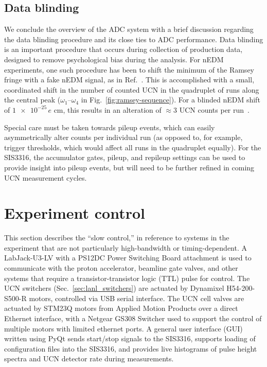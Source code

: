 
\subsection{Data blinding}\label{sec:sis3316_data_blinding}


We conclude the overview of the ADC system with a brief discussion regarding the data blinding procedure and its close ties to ADC performance. Data blinding is an important procedure that occurs during collection of production data, designed to remove psychological bias during the analysis. For nEDM experiments, one such procedure has been to shift the minimum of the Ramsey fringe with a fake nEDM signal, as in Ref.~\cite{Ayres_psi_data_blinding_2021}. This is accomplished with a small, coordinated shift in the number of counted UCN in the quadruplet of runs along the central peak ($\omega_1$--$\omega_4$ in Fig.~\ref{fig:ramsey-sequence}). For a blinded nEDM shift of $\num{1e-25}\,e\text{ cm}$, this results in an alteration of $\approx 3$ UCN counts per run~\cite{Ayres_psi_data_blinding_2021}.

Special care must be taken towards pileup events, which can easily asymmetrically alter counts per individual run (as opposed to, for example, trigger thresholds, which would affect all runs in the quadruplet equally). For the SIS3316, the accumulator gates, pileup, and repileup settings can be used to provide insight into pileup events, but will need to be further refined in coming UCN measurement cycles.


\section{Experiment control}\label{sec:slow_control}


This section describes the ``slow control,'' in reference to systems in the experiment that are not particularly high-bandwidth or timing-dependent. A LabJack-U3-LV with a PS12DC Power Switching Board attachment is used to communicate with the proton accelerator, beamline gate valves, and other systems that require a transistor-transistor logic (TTL) pulse for control. The UCN switchers (Sec.~\ref{sec:lanl_switchers}) are actuated by Dynamixel H54-200-S500-R motors, controlled via USB serial interface. The UCN cell valves are actuated by STM23Q motors from Applied Motion Products over a direct Ethernet interface, with a Netgear GS308 Switcher used to support the control of multiple motors with limited ethernet ports. A general user interface (GUI) written using PyQt sends start/stop signals to the SIS3316, supports loading of configuration files into the SIS3316, and provides live histograms of pulse height spectra and UCN detector rate during measurements. 

